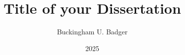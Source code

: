 \documentclass[12pt,oneside,letterpaper]{memoir}
\title{Title of your Dissertation}
\author{Buckingham U. Badger}  %
\date{2025}  %
\begin{document}
\maketitle



\DoubleSpacing





\end{document}
